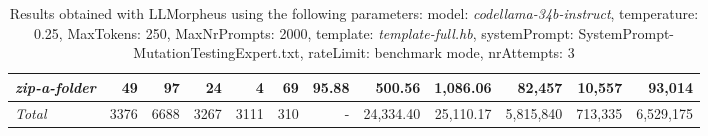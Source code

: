 \begin{table*}
{\begin{tabular}{l||r|r|r|r|r|r||r|r||r|r|r}
   \hline
   \textit{zip-a-folder} & 49 & 97 & 24 & 4 & 69 & 95.88 & 500.56 & 1,086.06 & 82,457 & 10,557 & 93,014 \\ 
   \hline
   \textit{Total} & 3376 & 6688 & 3267 & 3111 & 310 & - & 24,334.40  & 25,110.17 & 5,815,840 & 713,335 & 6,529,175 \\ 
 \end{tabular}
 }
 \caption{Results obtained with LLMorpheus using the following parameters: 
   model: \textit{codellama-34b-instruct}, 
   temperature: 0.25, 
   MaxTokens: 250, 
   MaxNrPrompts: 2000, 
   template: \textit{template-full.hb}, 
   systemPrompt: SystemPrompt-MutationTestingExpert.txt, 
   rateLimit: benchmark mode, 
   nrAttempts: 3  
 }
\end{table*}

